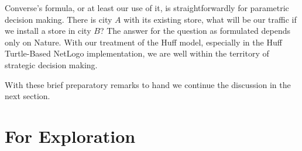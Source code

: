 Converse's formula, or at least our use of it, is straightforwardly for parametric decision making. There is city $A$ with its existing store, what will be our traffic if we install a store in city $B$? The answer for the question as formulated depends only on Nature. With our treatment of the Huff model, especially in the Huff Turtle-Based NetLogo implementation, we are well within the territory of strategic decision making.

With these brief preparatory remarks to hand we continue the discussion in the next section.



\section{For Exploration}

